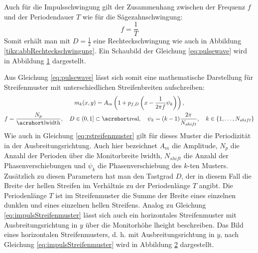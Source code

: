 Auch für die Impulsschwingung gilt der Zusammenhang zwischen der Frequenz $f$ und der Periodendauer $T$ wie für die Sä\-ge\-zahn\-schwin\-gung:
%
\begin{equation*}
	f = \dfrac{1}{T}
\end{equation*}
%
Somit erhält man mit $D = \tfrac{1}{2}$ eine Rechteckschwingung wie auch in Abbildung \ref{tikz:abbRechteckschwingung}.
Ein Schaubild der Gleichung \ref{eq:pulsewave} wird in Abbildung \ref{tikz:abbNormalPulsewave} dargestellt.
%
{
	\begin{figure}[H]
		\centering
		
		\label{tikz:abbNormalPulsewave}
	\end{figure}
}
%
\noindent
Aus Gleichung \ref{eq:pulsewave} lässt sich somit eine mathematische Darstellung für Streifenmuster mit unterschiedlichen Streifenbreiten aufschreiben:
%
\begin{equation} \label{eq:impulsStreifenmuster}
	\begin{gathered}
		m_k(x,y) = A_m \left( 1 + p_{f,D}\left( x - \dfrac{1}{2 \pi f} \psi_k \right) \right),
		\\
		f = \dfrac{N_p}{\acrshortmath{lwidth}},
		\quad
		D \in \left(0,1\right] \subset \acrshortmath{real},
		\quad
		\psi_k = (k - 1)\dfrac{2\pi}{N_{shift}},
		\quad
		k \in \lbrace 1,\ldots,N_{shift}\rbrace
	\end{gathered}
\end{equation}
%
Wie auch in Gleichung \ref{eq:rstreifenmuster} gilt für dieses Muster die Periodizität in der Ausbreitungsrichtung.
Auch hier bezeichnet $A_m$ die Amplitude, $N_p$ die Anzahl der Perioden über die Monitorbreite \acrshort{lwidth}, $N_{shift}$ die Anzahl der Phasenverschiebungen und $\psi_k$ die Phasenverschiebung des $k$-ten Musters.
Zusätzlich zu diesen Parametern hat man den Tastgrad $D$, der in diesem Fall die Breite der hellen Streifen im Verhältnis zu der Periodenlänge $T$ angibt.
Die Periodenlänge $T$ ist im Streifenmuster die Summe der Breite eines einzelnen dunklen und eines einzelnen hellen Streifens.
Analog zu Gleichung \ref{eq:impulsStreifenmuster} lässt sich auch ein horizontales Streifenmuster mit Ausbreitungsrichtung in $y$ über die Monitorhöhe \acrshort{lheight} beschreiben.
Das Bild eines horizontalen Streifenmusters, d. h. mit Ausbreitungsrichtung in $y$, nach Gleichung \ref{eq:impulsStreifenmuster} wird in Abbildung \ref{tikz:abbImpulsStreifenmuster} dargestellt.
%
{
	\begin{figure}[H]
		\centering
		
		\label{tikz:abbImpulsStreifenmuster}
	\end{figure}
}